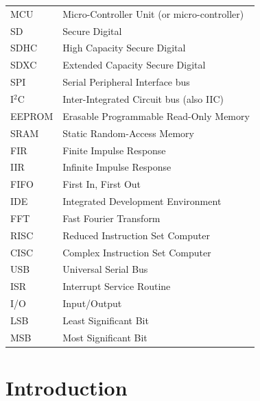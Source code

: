 \documentclass[english,12pt,a4paper,pdftex,elec,utf8]{aaltothesis}
\begin{document}
\begin{tabular}{ll}
MCU & Micro-Controller Unit (or micro-controller) \\
SD & Secure Digital \\
SDHC & High Capacity Secure Digital \\
SDXC & Extended Capacity Secure Digital \\
SPI & Serial Peripheral Interface bus \\
I$^2$C & Inter-Integrated Circuit bus (also IIC) \\
EEPROM & Erasable Programmable Read-Only Memory \\
SRAM & Static Random-Access Memory \\
FIR & Finite Impulse Response \\
IIR & Infinite Impulse Response \\
FIFO & First In, First Out \\
IDE & Integrated Development Environment \\
FFT & Fast Fourier Transform \\
RISC & Reduced Instruction Set Computer \\
CISC & Complex Instruction Set Computer \\
USB & Universal Serial Bus \\
ISR & Interrupt Service Routine \\
I/O & Input/Output \\
LSB & Least Significant Bit \\
MSB & Most Significant Bit \\
\end{tabular}



\cleardoublepage
\storeinipagenumber
{}
\setcounter{page}{1}



\clearpage
\section{Introduction}
\thispagestyle{empty}
\end{document}
